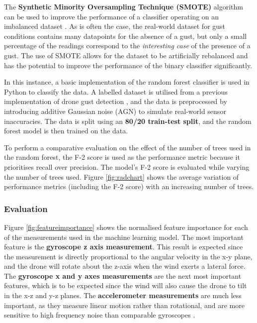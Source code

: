 The  \textbf{Synthetic Minority Oversampling Technique (SMOTE)} algorithm can be used to improve the performance of a classifier operating on an imbalanced dataset \cite{chawla2002smote}. As is often the case, the real-world dataset for gust conditions contains many datapoints for the absence of a gust, but only a small percentage of the readings correspond to the \textit{interesting case} of the presence of a gust. The use of SMOTE allows for the dataset to be artificially rebalanced and has the potential to improve the performance of the binary classifier significantly.

In this instance, a basic implementation of the random forest classifier \cite{scikit-learn} is used in Python to classify the data. A labelled dataset is utilised from a previous implementation of drone gust detection \cite{gu2018wind}, and the data is preprocessed by introducing additive Gaussian noise (AGN) to simulate real-world sensor inaccuracies. The data is split using an \textbf{80/20 train-test split}, and the random forest model is then trained on the data. 

To perform a comparative evaluation on the effect of the number of trees used in the random forest, the F-2 score is used as the performance metric because it prioritises recall over precision. The model's F-2 score is evaluated while varying the number of trees used. Figure \ref{fig:radchart} shows the average variation of performance metrics (including the F-2 score) with an increasing number of trees. 

\subsubsection{Evaluation}

Figure \ref{fig:featureimportance} shows the normalised feature importance for each of the measurements used in the machine learning model. The most important feature is the \textbf{gyroscope z axis measurement}. This result is expected since the measurement is directly proportional to the angular velocity in the x-y plane, and the drone will rotate about the z-axis when the wind exerts a lateral force. The \textbf{gyroscope x and y axes measurements} are the next most important features, which is to be expected since the wind will also cause the drone to tilt in the x-z and y-z planes. The \textbf{accelerometer measurements} are much less important, as they measure linear motion rather than rotational, and are more sensitive to high frequency noise than comparable gyroscopes \cite{CASSON2016175}. 

